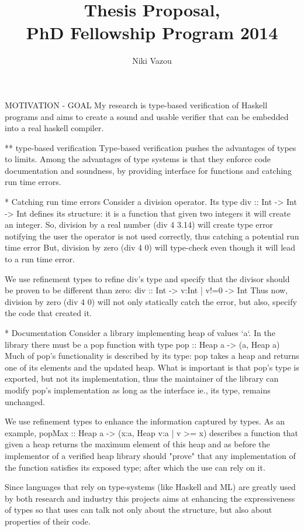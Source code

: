 \documentclass[10pt,a4paper]{article}
\title{Thesis Proposal, \\PhD Fellowship Program 2014}
\author{Niki Vazou}
\date{}
\begin{document}
\maketitle
MOTIVATION - GOAL
My research is type-based verification of Haskell programs 
and aims to create a sound and usable verifier that can be
embedded into a real haskell compiler.

** type-based verification
Type-based verification pushes the advantages of types to limits.
Among the advantages of type systems is that they enforce code documentation and soundness, by providing interface for functions and catching run time errors.

* Catching run time errors
Consider a division operator. Its type 
div :: Int -> Int -> Int
defines its structure: it is a function that given two integers it will create an integer.
%
So, division by a real number (div 4 3.14) will create type error notifying the user the operator is not used correctly, thus catching a potential run time error 
But, division by zero (div 4  0) will type-check even though it will lead to a run time error.

We use refinement types to refine div's type and specify that the divisor should be proven to be different than zero: 
div :: Int -> {v:Int | v!=0} -> Int
Thus now, division by zero (div 4 0) will not only statically catch the 
error, but also, specify the code that created it.

* Documentation
Consider a library implementing heap of values `a`.
In the library there must be a pop function with type
pop :: Heap a -> (a, Heap a)
Much of pop's functionality is described by its type:
pop takes a heap and returns one of its elements and the updated heap.
What is important is that pop's type is exported, but not its implementation, 
thus the maintainer of the library can modify pop's implementation  as long as the interface ie., its type, remains unchanged.


We use refinement types to enhance the information captured by types.
As an example, 
popMax :: Heap a -> (x:a, Heap {v:a | v >= x})
describes a function that given a heap returns the maximum element of this heap and as before the implementor of a verified heap library 
should "prove" that any implementation of the function satisfies its exposed type; after which the use can rely on it.


Since languages that rely on type-systems (like Haskell and ML) 
are greatly used by both research and industry this projects aims 
at enhancing the expressiveness of types 
so that uses can talk not only about the structure, but also about properties of their code.  
\end{document}
